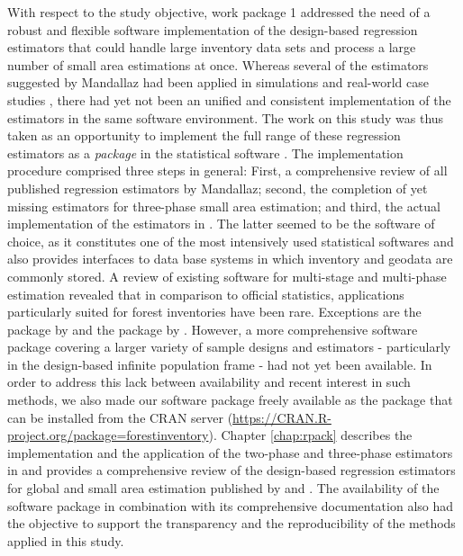 With respect to the study objective, work package 1 addressed the need of a robust and flexible software implementation of the design-based regression estimators that could handle large inventory data sets and process a large number of small area estimations at once. Whereas several of the estimators suggested by Mandallaz had been applied in simulations and real-world case studies \citep{mandallaz2013a, mandallaz2013b, mandallaz2013c, massey2014a, massey2015a, massey2015b}, there had yet not been an unified and consistent implementation of the estimators in the same software environment. The work on this study was thus taken as an opportunity to implement the full range of these regression estimators as a \textit{package} in the statistical software  \citep{R}. The implementation procedure comprised three steps in general: First, a comprehensive review of all published regression estimators by Mandallaz; second, the completion of yet missing estimators for three-phase small area estimation; and third, the actual implementation of the estimators in . The latter seemed to be the software of choice, as it constitutes one of the most intensively used statistical softwares and also provides interfaces to data base systems in which inventory and geodata are commonly stored. A review of existing software for multi-stage and multi-phase estimation revealed that in comparison to official statistics, applications particularly suited for forest inventories have been rare. Exceptions are the  package  by \citet{josae2015} and the  package by \citet{cullmann2016}. However, a more comprehensive software package covering a larger variety of sample designs and estimators - particularly in the design-based infinite population frame - had not yet been available. In order to address this lack between availability and recent interest in such methods, we also made our software package freely available as the  package  that can be installed from the CRAN server (\url{https://CRAN.R-project.org/package=forestinventory}). Chapter \ref{chap:rpack} describes the implementation and the application of the two-phase and three-phase estimators in  and provides a comprehensive review of the design-based regression estimators for global and small area estimation published by \citet{mandallaz2008, mandallaz2013a, mandallaz2013c} and \citet{mandallaz2013b}. The availability of the software package in combination with its comprehensive documentation also had the objective to support the transparency and the reproducibility of the methods applied in this study.


